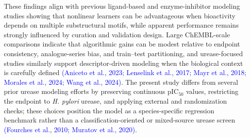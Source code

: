\documentclass[11pt]{article}
\begin{document}
These findings align with previous ligand-based and enzyme-inhibitor modeling studies showing that nonlinear learners can be advantageous when bioactivity depends on multiple substructural motifs, while apparent performance remains strongly influenced by curation and validation design. Large ChEMBL-scale comparisons indicate that algorithmic gains can be modest relative to endpoint consistency, analogue-series bias, and train--test partitioning, and urease-focused studies similarly support descriptor-driven modeling when the biological context is carefully defined \textcolor{blue}{(Aniceto et al., 2023; Lenselink et al., 2017; Mayr et al., 2018; Morales et al., 2024; Wang et al., 2024)}. The present study differs from several prior urease modeling efforts by preserving continuous pIC$_{50}$ values, restricting the endpoint to \textit{H. pylori} urease, and applying external and randomization checks; these choices position the model as a species-specific regression benchmark rather than a classification-oriented or mixed-source urease screen \textcolor{blue}{(Fourches et al., 2010; Muratov et al., 2020)}.
\end{document}
